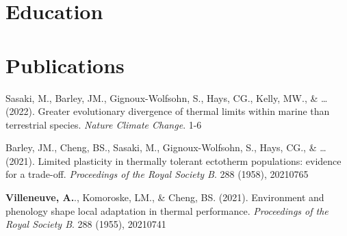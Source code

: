 \documentclass[11pt,a4paper,]{awesome-cv}
\begin{document}
\makecvheader






\hypertarget{education}{%
\section{Education}\label{education}}

\begin{cventries}
    \vspace{-4.0mm}
    \vspace{-4.0mm}
    \vspace{-4.0mm}
\end{cventries}

\hypertarget{publications}{%
\section{Publications}\label{publications}}

Sasaki, M., Barley, JM., Gignoux-Wolfsohn, S., Hays, CG., Kelly, MW., \&
\ldots{} (2022). Greater evolutionary divergence of thermal limits
within marine than terrestrial species. \emph{Nature Climate Change}.
1-6

Barley, JM., Cheng, BS., Sasaki, M., Gignoux-Wolfsohn, S., Hays, CG., \&
\ldots{} (2021). Limited plasticity in thermally tolerant ectotherm
populations: evidence for a trade-off. \emph{Proceedings of the Royal
Society B}. 288 (1958), 20210765

\textbf{Villeneuve, A.}., Komoroske, LM., \& Cheng, BS. (2021).
Environment and phenology shape local adaptation in thermal performance.
\emph{Proceedings of the Royal Society B}. 288 (1955), 20210741
\end{document}
